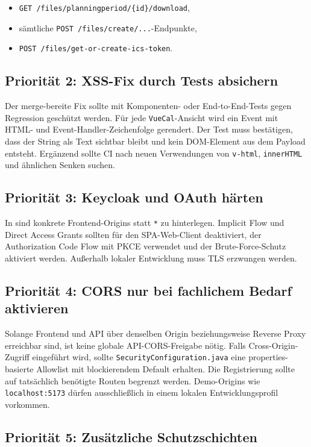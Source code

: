 \begin{itemize}
  \item \texttt{GET /files/planningperiod/\{id\}/download},
  \item sämtliche \texttt{POST /files/create/...}-Endpunkte,
  \item \texttt{POST /files/get-or-create-ics-token}.
\end{itemize}

\subsection{Priorität 2: XSS-Fix durch Tests absichern}

Der merge-bereite Fix sollte mit Komponenten- oder End-to-End-Tests
gegen Regression geschützt werden. Für jede \texttt{VueCal}-Ansicht
wird ein Event mit HTML- und Event-Handler-Zeichenfolge gerendert.
Der Test muss bestätigen, dass der String als Text sichtbar bleibt
und kein DOM-Element aus dem Payload entsteht. Ergänzend sollte CI
nach neuen Verwendungen von \texttt{v-html}, \texttt{innerHTML} und
ähnlichen Senken suchen.

\subsection{Priorität 3: Keycloak und OAuth härten}

In  sind konkrete Frontend-Origins statt
\texttt{*} zu hinterlegen. Implicit Flow und Direct Access Grants
sollten für den SPA-Web-Client deaktiviert, der Authorization Code
Flow mit PKCE verwendet und der Brute-Force-Schutz aktiviert werden.
Außerhalb lokaler Entwicklung muss TLS erzwungen werden.

\subsection{Priorität 4: CORS nur bei fachlichem Bedarf aktivieren}

Solange Frontend und API über denselben Origin beziehungsweise
Reverse Proxy erreichbar sind, ist keine globale API-CORS-Freigabe
nötig. Falls Cross-Origin-Zugriff eingeführt wird, sollte
\texttt{SecurityConfiguration.java} eine properties-basierte
Allowlist mit blockierendem Default erhalten. Die Registrierung
sollte auf tatsächlich benötigte Routen begrenzt werden. Demo-Origins
wie \texttt{localhost:5173} dürfen ausschließlich in einem lokalen
Entwicklungsprofil vorkommen.

\subsection{Priorität 5: Zusätzliche Schutzschichten}

